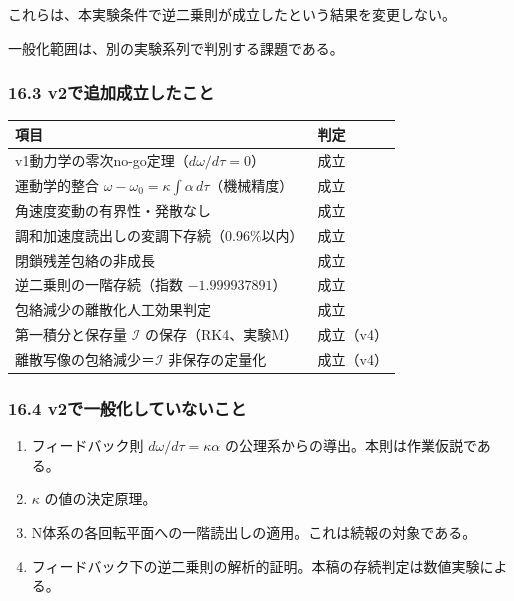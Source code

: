 \documentclass[
  a4paper,
]{ltjsarticle}
\newcounter{none} %
\providecommand{\tightlist}{%
  \setlength{\itemsep}{0pt}\setlength{\parskip}{0pt}}
\begin{document}
これらは、本実験条件で逆二乗則が成立したという結果を変更しない。

一般化範囲は、別の実験系列で判別する課題である。

\subsubsection{16.3
v2で追加成立したこと}\label{v2ux3067ux8ffdux52a0ux6210ux7acbux3057ux305fux3053ux3068}

{\def\LTcaptype{none} %
\begin{longtable}[]{@{}
  >{\raggedright\arraybackslash}p{}
  >{\raggedright\arraybackslash}p{}@{}}
\toprule\noalign{}
\begin{minipage}[b]{\linewidth}\raggedright
項目
\end{minipage} & \begin{minipage}[b]{\linewidth}\raggedright
判定
\end{minipage} \\
\midrule\noalign{}
\endhead
\bottomrule\noalign{}
\endlastfoot
v1動力学の零次no-go定理（\(d\omega/d\tau=0\)） & 成立 \\
運動学的整合 \(\omega-\omega_0=\kappa\int\alpha\,d\tau\)（機械精度） &
成立 \\
角速度変動の有界性・発散なし & 成立 \\
調和加速度読出しの変調下存続（\(0.96\%\)以内） & 成立 \\
閉鎖残差包絡の非成長 & 成立 \\
逆二乗則の一階存続（指数 \(-1.999937891\)） & 成立 \\
包絡減少の離散化人工効果判定 & 成立 \\
第一積分と保存量 \(\mathcal I\) の保存（RK4、実験M） & 成立（v4） \\
離散写像の包絡減少＝\(\mathcal I\) 非保存の定量化 & 成立（v4） \\
\end{longtable}
}

\subsubsection{16.4
v2で一般化していないこと}\label{v2ux3067ux4e00ux822cux5316ux3057ux3066ux3044ux306aux3044ux3053ux3068}

\begin{enumerate}
\def\labelenumi{\arabic{enumi}.}
\tightlist
\item
  フィードバック則 \(d\omega/d\tau=\kappa\alpha\)
  の公理系からの導出。本則は作業仮説である。
\item
  \(\kappa\) の値の決定原理。
\item
  N体系の各回転平面への一階読出しの適用。これは続報の対象である。
\item
  フィードバック下の逆二乗則の解析的証明。本稿の存続判定は数値実験による。
\end{enumerate}
\end{document}
